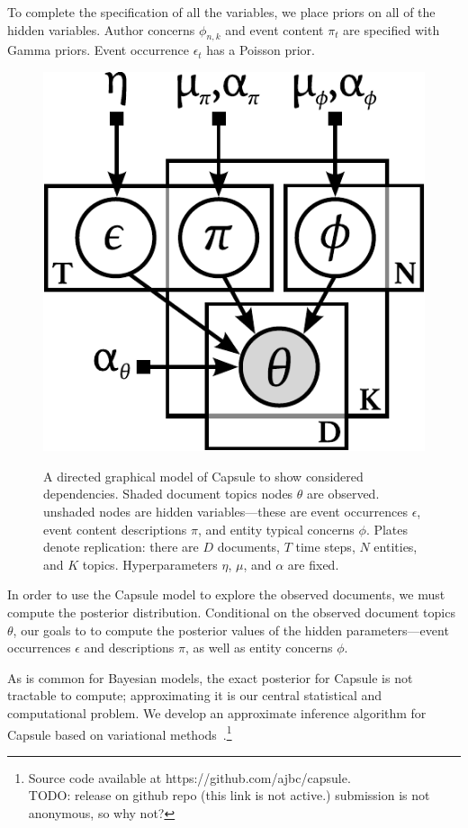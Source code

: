 To complete the specification of all the variables, we place priors on all of the hidden variables.  Author concerns $\phi_{n,k}$ and event content $\pi_t$ are specified with Gamma priors.  Event occurrence $\epsilon_t$ has a Poisson prior.

\begin{figure}
\centering
\includegraphics[width=0.5\linewidth]{fig/graphicalmodel.pdf}
\label{fig:graphicalmodel}
\vskip -6pt
\caption{A directed graphical model of Capsule to show considered dependencies. Shaded document topics nodes $\theta$ are observed. unshaded nodes are hidden variables---these are event occurrences $\epsilon$, event content descriptions $\pi$, and entity typical concerns $\phi$. Plates denote replication: there are $D$ documents, $T$ time steps, $N$ entities, and $K$ topics. Hyperparameters $\eta$, $\mu$, and $\alpha$ are fixed.}
\end{figure}

In order to use the Capsule model to explore the observed documents, we must compute the posterior distribution.  Conditional on the observed document topics $\theta$, our goals to to compute the posterior values of the hidden parameters---event occurrences $\epsilon$ and descriptions $\pi$, as well as entity concerns $\phi$.

As is common for Bayesian models, the exact posterior for Capsule is not tractable to compute; approximating it is our central statistical and computational problem.  We develop an approximate inference algorithm for Capsule based on variational methods~\cite{Wainwright:2008}.\footnote{Source code available at https://github.com/ajbc/capsule.\\ TODO: release on github repo (this link is not active.)  submission is not anonymous, so why not?}


